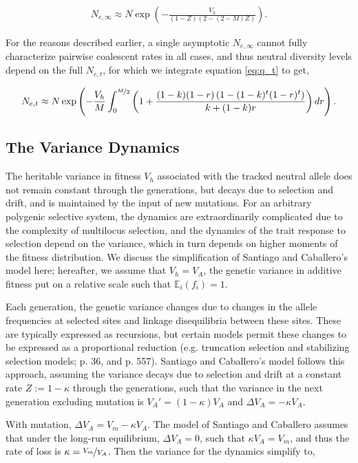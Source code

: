 \documentclass[11pt]{article}
\newcommand{\E}{\mathbb{E}}
\begin{document}
\begin{align}
  N_{e,\infty} \approx N \exp\left(-\frac{V_h}{(1-Z) (2-(2-M) Z)} \right).
\end{align}

For the reasons described earlier, a single asymptotic $N_{e,\infty}$ cannot
fully characterize pairwise coalescent rates in all cases, and thus neutral
diversity levels depend on the full $N_{e,t}$, for which we integrate equation
\eqref{eq:q_t} to get,

\begin{align}
  \label{eq:net_integral}
  N_{e,t} \approx N \exp\left(-\frac{V_h}{M} \int_0^{\nicefrac{M}{2}} \left(1+\frac{(1-k) (1-r) \left(1-(1-k)^t (1-r)^t\right)}{k+(1-k)r} \right) dr \right).
\end{align}

\subsection*{The Variance Dynamics}

The heritable variance in fitness $V_h$ associated with the tracked neutral
allele does not remain constant through the generations, but decays due to
selection and drift, and is maintained by the input of new mutations. For an
arbitrary polygenic selective system, the dynamics are extraordinarily
complicated due to the complexity of multilocus selection, and the dynamics of
the trait response to selection depend on the variance, which in turn depends
on higher moments of the fitness distribution. We discuss the simplification of
Santiago and Caballero's model here; hereafter, we assume that $V_h = V_A$, the
genetic variance in additive fitness put on a relative scale such that
$\E_i(f_i) = 1$. 

Each generation, the genetic variance changes due to changes in the allele
frequencies at selected sites and linkage disequilibria between these sites.
These are typically expressed as recursions, but certain models permit these
changes to be expressed as a proportional reduction (e.g. truncation selection
and stabilizing selection models; \cite{Keightley1988-eq} p. 36, and
\cite{Walsh2018-bt} p. 557). Santiago and Caballero's model follows this
approach, assuming the variance decays due to selection and drift at a constant
rate $Z := 1-\kappa$ through the generations, such that the variance in the next
generation excluding mutation is $V_A' = (1-\kappa) V_A$ and $\Delta V_A =
-\kappa V_A$.

With mutation, $\Delta V_A = V_m - \kappa V_A$. The model of Santiago and
Caballero assumes that under the long-run equilibrium, $\Delta V_A = 0$, such
that $\kappa V_A = V_m$, and thus the rate of loss is $\kappa =
\nicefrac{V_m}{V_A}$. Then the variance for the dynamics simplify to,
\end{document}
